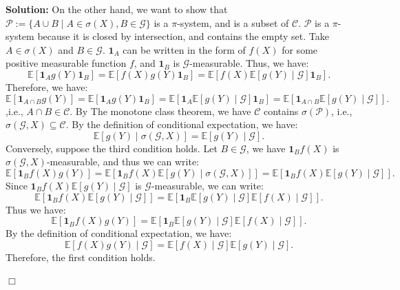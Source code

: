 \documentclass[12pt]{article}
\newenvironment{solution}{\vspace{0.2cm}\color{blue}\textbf{Solution:}}{\hfill\ensuremath{\Box}}
\begin{document}
\begin{solution}
    On the other hand, we want to show that $\mathcal{P}:= \{A\cup B \mid A \in\sigma(X), B\in\mathcal{G} \}$ is a $\pi$-system, and is a subset of $\mathcal{C}$.
    $\mathcal{P}$ is a $\pi$-system because it is closed by intersection, and contains the empty set.
    Take $A \in \sigma(X)$ and $B \in \mathcal{G}$. $\mathbf{1}_A$ can be written in the form of $f(X)$ for some positive measurable function $f$, and $\mathbf{1}_B$ is $\mathcal{G}$-measurable. Thus, we have:
    \[\mathbb{E}[\mathbf{1}_A g(Y) \mathbf{1}_B] = \mathbb{E}[f(X)g(Y) \mathbf{1}_B] = \mathbb{E}[f(X)\mathbb{E}[g(Y) \mid \mathcal{G}]\mathbf{1}_B].\]
    Therefore, we have:
    \[\mathbb{E}[\mathbf{1}_{A\cap B} g(Y)] = \mathbb{E}[\mathbf{1}_A g(Y) \mathbf{1}_B] = \mathbb{E}[\mathbf{1}_A\mathbb{E}[g(Y) \mid \mathcal{G}]\mathbf{1}_B] = \mathbb{E}[\mathbf{1}_{A\cap B}\mathbb{E}[g(Y) \mid \mathcal{G}]].\],i.e., $A\cap B \in \mathcal{C}$. By The monotone class theorem, we have $\mathcal{C}$ contains $\sigma(\mathcal{P})$, i.e., $\sigma(\mathcal{G},X) \subseteq \mathcal{C}$.
    By the definition of conditional expectation, we have:
    \[\mathbb{E}[g(Y) \mid \sigma(\mathcal{G},X)] = \mathbb{E}[g(Y) \mid \mathcal{G}].\]
    Conversely, suppose the third condition holds. Let $B \in \mathcal{G}$, we have $\mathbf{1}_B f(X)$ is $\sigma(\mathcal{G},X)$-measurable, and thus we can write:
    \[\mathbb{E}[\mathbf{1}_B f(X)g(Y)] = \mathbb{E}[\mathbf{1}_Bf(X)\mathbb{E}[g(Y) \mid \sigma(\mathcal{G},X)]]= \mathbb{E}[\mathbf{1}_B f(X)\mathbb{E}[g(Y) \mid \mathcal{G}]].\]
    Since $\mathbf{1}_B f(X)\mathbb{E}[g(Y) \mid \mathcal{G}]$ is $\mathcal{G}$-measurable, we can write:
    \[\mathbb{E}[\mathbf{1}_B f(X)\mathbb{E}[g(Y) \mid \mathcal{G}]]= \mathbb{E}[\mathbf{1}_B\mathbb{E}[g(Y) \mid \mathcal{G}]\mathbb{E}[f(X) \mid \mathcal{G}]].\]
    Thus we have:
    \[\mathbb{E}[\mathbf{1}_B f(X)g(Y)] = \mathbb{E}[\mathbf{1}_B\mathbb{E}[g(Y) \mid \mathcal{G}]\mathbb{E}[f(X) \mid \mathcal{G}]].\]
    By the definition of conditional expectation, we have:
    \[\mathbb{E}[f(X)g(Y) \mid \mathcal{G}] = \mathbb{E}[f(X) \mid \mathcal{G}]\mathbb{E}[g(Y) \mid \mathcal{G}].\]
    Therefore, the first condition holds.

\end{solution}
\end{document}
